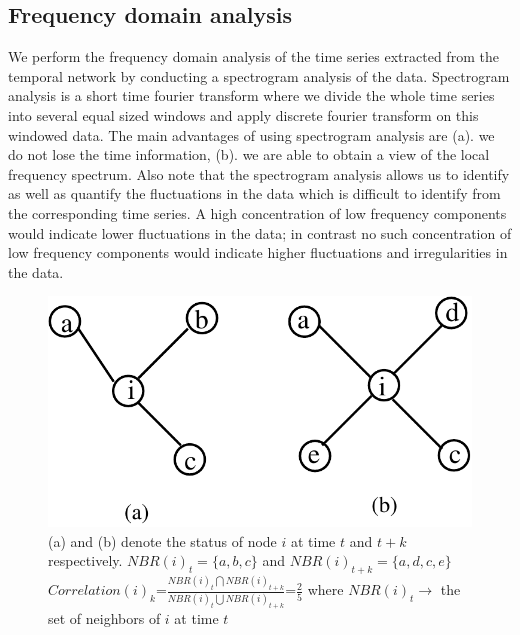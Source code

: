 \noindent
\subsection{Frequency domain analysis}
\label{spectrogram}
 


We perform the frequency domain analysis of 
the time series extracted from the temporal network
by conducting
  a spectrogram analysis of the data. Spectrogram analysis is a short time fourier transform 
where we divide the whole time series into several equal sized windows and apply discrete fourier transform on this windowed data.
The main advantages of using spectrogram analysis are
 (a). we do not lose the time information,
 (b). we are able to obtain a view of the local frequency spectrum.
Also note that the spectrogram analysis allows us to identify as well as quantify the fluctuations in the data which is difficult to identify 
from the corresponding time series. 
A high concentration of low frequency components would indicate lower fluctuations in the data; in contrast no such concentration of low frequency components 
would indicate higher fluctuations and irregularities in the data.

\begin{figure}
 \begin{center}
 \includegraphics[width=0.45\columnwidth, angle=0]{./texfiles/Chapter_1/fig/jaccard-eps-converted-to.pdf}
 \caption{\label{fig2}(a) and (b) denote the status of node $i$ at time $t$ and $t+k$ respectively. $NBR(i)_{t}=\{a,b,c\}$ and $NBR(i)_{t+k}=\{a,d,c,e\}$ 
 $Correlation(i)_{k}$={\large$\frac{NBR(i)_{t}\bigcap NBR(i)_{t+k}}{NBR(i)_{t}\bigcup NBR(i)_{t+k}}$}={\large$\frac{2}{5}$} where $NBR(i)_{t}\rightarrow$ the set of neighbors of $i$ at time $t$}
  \end{center}
 \end{figure}

